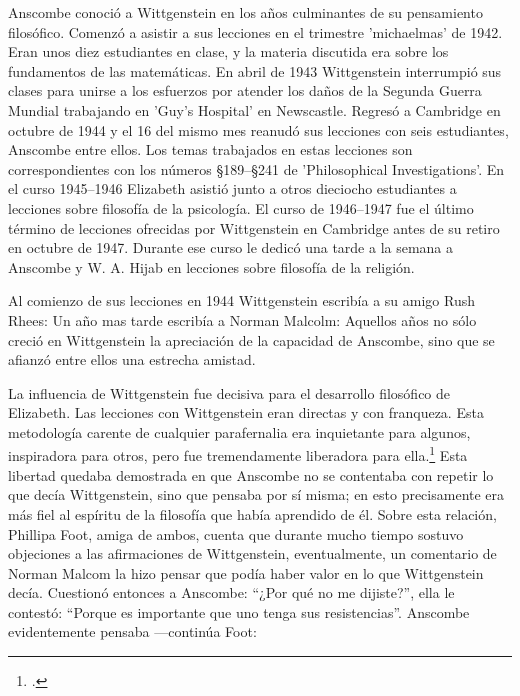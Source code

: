 Anscombe conoció a Wittgenstein en los años culminantes de su pensamiento
filosófico. Comenzó a asistir a sus lecciones en el trimestre 'michaelmas' de
1942. Eran unos diez estudiantes en clase, y la materia discutida era sobre los
fundamentos de las matemáticas. En abril de 1943 Wittgenstein interrumpió sus
clases para unirse a los esfuerzos por atender los daños de la Segunda Guerra
Mundial trabajando en 'Guy's Hospital' en Newscastle. Regresó a Cambridge en
octubre de 1944 y el 16 del mismo mes reanudó sus lecciones con seis
estudiantes, Anscombe entre ellos. Los temas trabajados en estas lecciones son
correspondientes con los números \S189--\S241 de 'Philosophical Investigations'.
En el curso 1945--1946 Elizabeth asistió junto a otros dieciocho estudiantes a
lecciones sobre filosofía de la psicología. El curso de 1946--1947 fue el último
término de lecciones ofrecidas por Wittgenstein en Cambridge antes de su retiro
en octubre de 1947. Durante ese curso le dedicó una tarde a la semana a Anscombe
y W. A. Hijab en lecciones sobre filosofía de la religión.

Al comienzo de sus lecciones en 1944 Wittgenstein escribía a su amigo Rush Rhees:
Un año mas tarde escribía a Norman Malcolm:
Aquellos años no sólo creció en Wittgenstein la apreciación de la capacidad de
Anscombe, sino que se afianzó entre ellos una estrecha amistad. 

La influencia de Wittgenstein fue decisiva para el desarrollo filosófico de
Elizabeth. Las lecciones con Wittgenstein eran directas y con franqueza. Esta
metodología carente de cualquier parafernalia era inquietante para algunos,
inspiradora para otros, pero fue tremendamente liberadora para
ella.\footcite[loc 9853 Chapter 4, Section 24, \S5]{monk} Esta libertad
quedaba demostrada en que Anscombe no se contentaba con repetir lo que decía
Wittgenstein, sino que pensaba por sí misma; en esto precisamente era más fiel
al espíritu de la filosofía que había aprendido de él. Sobre esta relación,
Phillipa Foot, amiga de ambos, cuenta que durante mucho tiempo sostuvo
objeciones a las afirmaciones de Wittgenstein, eventualmente, un comentario de
Norman Malcom la hizo pensar que podía haber valor en lo que Wittgenstein decía.
Cuestionó entonces a Anscombe: 
``¿Por qué no me dijiste?'', ella le contestó: ``Porque es importante que uno
tenga sus resistencias''. Anscombe evidentemente pensaba ---continúa Foot: 


